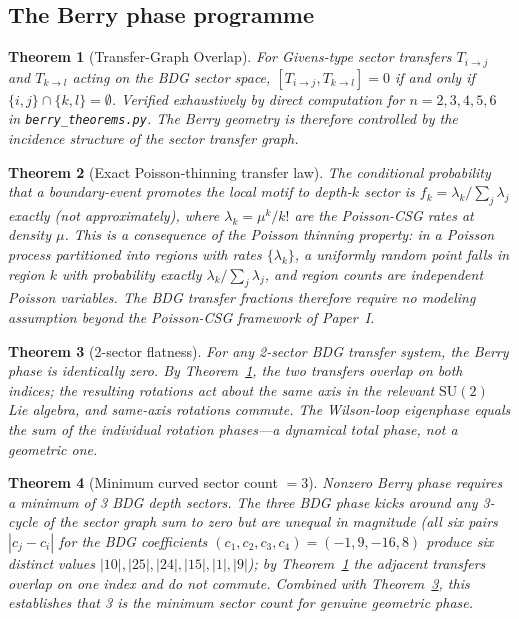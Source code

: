 \documentclass[11pt]{article}
\newtheorem{theorem}{Theorem}
\begin{document}
\subsection{The Berry phase programme}

\begin{theorem}[Transfer-Graph Overlap]
\label{thm:overlap}
For Givens-type sector transfers $T_{i\to j}$ and $T_{k\to l}$ acting on the BDG sector space, $[T_{i\to j},T_{k\to l}]=0$ if and only if $\{i,j\}\cap\{k,l\}=\emptyset$. Verified exhaustively by direct computation for $n=2,3,4,5,6$ in \texttt{berry\_theorems.py}. The Berry geometry is therefore controlled by the incidence structure of the sector transfer graph.
\end{theorem}

\begin{theorem}[Exact Poisson-thinning transfer law]
\label{thm:thinning}
The conditional probability that a boundary-event promotes the local motif to depth-$k$ sector is $f_k=\lambda_k/\sum_j\lambda_j$ exactly (not approximately), where $\lambda_k=\mu^k/k!$ are the Poisson-CSG rates at density $\mu$. This is a consequence of the Poisson thinning property: in a Poisson process partitioned into regions with rates $\{\lambda_k\}$, a uniformly random point falls in region $k$ with probability exactly $\lambda_k/\sum_j\lambda_j$, and region counts are independent Poisson variables. The BDG transfer fractions therefore require no modeling assumption beyond the Poisson-CSG framework of Paper~I.
\end{theorem}

\begin{theorem}[2-sector flatness]
\label{thm:2sector}
For any 2-sector BDG transfer system, the Berry phase is identically zero. By Theorem~\ref{thm:overlap}, the two transfers overlap on both indices; the resulting rotations act about the same axis in the relevant $\mathrm{SU}(2)$ Lie algebra, and same-axis rotations commute. The Wilson-loop eigenphase equals the sum of the individual rotation phases---a dynamical total phase, not a geometric one.
\end{theorem}

\begin{theorem}[Minimum curved sector count $=3$]
\label{thm:min3}
Nonzero Berry phase requires a minimum of 3 BDG depth sectors. The three BDG phase kicks around any 3-cycle of the sector graph sum to zero but are unequal in magnitude (all six pairs $|c_{j}-c_i|$ for the BDG coefficients $(c_1,c_2,c_3,c_4)=(-1,9,-16,8)$ produce six distinct values $|10|,|25|,|24|,|15|,|1|,|9|$); by Theorem~\ref{thm:overlap} the adjacent transfers overlap on one index and do not commute. Combined with Theorem~\ref{thm:2sector}, this establishes that 3 is the minimum sector count for genuine geometric phase.
\end{theorem}
\end{document}
